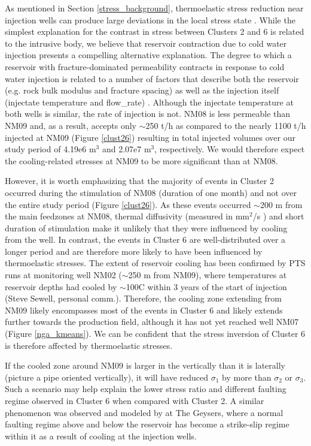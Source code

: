 As mentioned in Section \ref{stress_background}, thermoelastic stress reduction near injection wells can produce large deviations in the local stress state \citep{Jeanne_2015tensor}. While the simplest explanation for the contrast in stress between Clusters 2 and 6 is related to the intrusive body, we believe that reservoir contraction due to cold water injection presents a compelling alternative explanation. The degree to which a reservoir with fracture-dominated \gls{permeability} contracts in response to cold water injection is related to a number of factors that describe both the reservoir (e.g. rock bulk modulus and fracture spacing) as well as the injection itself (injectate temperature and \gls{flow_rate}) \citep{stephens1982hydraulic}. Although the injectate temperature at both wells is similar, the rate of injection is not. NM08 is less permeable than NM09 and, as a result, accepts only $\sim$250 t/h as compared to the nearly 1100 t/h injected at NM09 (Figure \ref{clust26}) resulting in total injected volumes over our study period of 4.19e6 m$^3$ and 2.07e7 m$^3$, respectively. We would therefore expect the cooling-related stresses at NM09 to be more significant than at NM08.

However, it is worth emphasizing that the majority of events in Cluster 2 occurred during the \gls{stimulation} of NM08 (duration of one month) and not over the entire study period (Figure \ref{clust26}). As these events occurred $\sim$200 m from the main \glspl{feedzone} at NM08, thermal \gls{diffusivity} (measured in mm$^2$/s \citep{Kanamori_1968}) and short duration of \gls{stimulation} make it unlikely that they were influenced by cooling from the well. In contrast, the events in Cluster 6 are well-distributed over a longer period and are therefore more likely to have been influenced by thermoelastic stresses. The extent of reservoir cooling has been confirmed by \acrshort{PTS} runs at monitoring well NM02 ($\sim$250 m from NM09), where temperatures at reservoir depths had cooled by $\sim$100\textdegree C within 3 years of the start of injection (Steve Sewell, personal comm.). Therefore, the cooling zone extending from NM09 likely encompasses most of the events in Cluster 6 and likely extends further towards the production field, although it has not yet reached well NM07 (Figure \ref{nga_kmeans}). We can be confident that the stress inversion of Cluster 6 is therefore affected by thermoelastic stresses.

If the cooled zone around NM09 is larger in the vertically than it is laterally (picture a pipe oriented vertically), it will have reduced $\sigma_{1}$ by more than $\sigma_{2}$ or $\sigma_{3}$. Such a scenario may help explain the lower stress ratio and different faulting regime observed in Cluster 6 when compared with Cluster 2. A similar phenomenon was observed and modeled by \citet{Jeanne_2015tensor,Mart_nez_Garz_n_2013} at The Geysers, where a normal faulting regime above and below the reservoir has become a strike-slip regime within it as a result of cooling at the injection wells.

